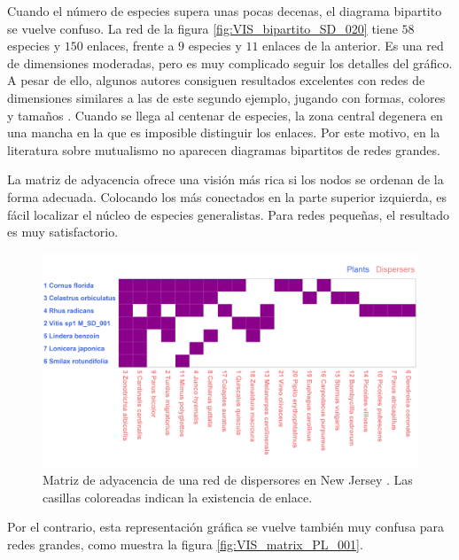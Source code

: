 Cuando el número de especies supera unas pocas decenas, el diagrama bipartito se vuelve confuso. La red de la figura \ref{fig:VIS_bipartito_SD_020} tiene $58$ especies y $150$ enlaces, frente a $9$ especies y $11$ enlaces de la anterior. Es una red de dimensiones moderadas, pero es muy complicado seguir los detalles del gráfico. A pesar de ello, algunos autores consiguen resultados excelentes con redes de dimensiones similares a las de este segundo ejemplo, jugando con formas, colores y tamaños \cite{dakos2014critical}. Cuando se llega al centenar de especies, la zona central degenera en una mancha en la que es imposible distinguir los enlaces. Por este motivo, en la literatura sobre mutualismo no aparecen diagramas bipartitos de redes grandes. 

La matriz de adyacencia ofrece una visión más rica si los nodos se ordenan de la forma adecuada. Colocando los más conectados en la parte superior izquierda, es fácil localizar el núcleo de especies generalistas. Para redes pequeñas, el resultado es muy satisfactorio.

\begin{figure}[h!]
\centering
\includegraphics[scale=0.14]{Figures/VIS_matrix_SD_001.png}
\caption{Matriz de adyacencia de una red de dispersores en New Jersey \cite{baird1980selection}. Las casillas coloreadas indican la existencia de enlace.}
\label{fig:VIS_matrix_SD_001}
\end{figure}

Por el contrario, esta representación gráfica se vuelve también muy confusa para redes grandes, como muestra la figura \ref{fig:VIS_matrix_PL_001}.

